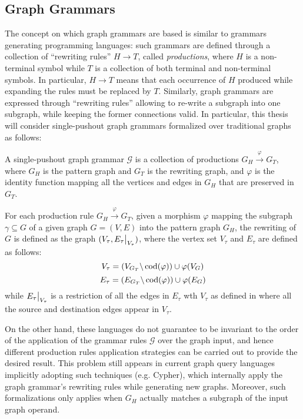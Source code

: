 \subsection{Graph Grammars}\label{subsec:ggram}
The concept on which  graph grammars are based is similar to grammars generating programming languages: such grammars are defined through a collection of ``rewriting rules'' $H\to T$, called \textit{productions}, where $H$ is a non-terminal symbol while $T$ is a collection of both terminal and non-terminal symbols. In particular, $H\to T$ means that each occurrence of $H$ produced while expanding the rules must be replaced by $T$. Similarly, graph grammars are expressed through ``rewriting rules'' allowing to re-write a subgraph into one subgraph, while keeping the former connections valid. In particular, this thesis will consider single-pushout graph grammars formalized over traditional graphs as follows:

\begin{definition}
	\label{def:graphgrammar}
  A single-pushout graph grammar $\mathcal{G}$ \cite{ModCheckWithGG,Lowe93} is a collection of productions $G_H\xrightarrow{\varphi}G_T$, where $G_H$ is the pattern graph and $G_T$ is the rewriting graph, and $\varphi$ is the identity function mapping all the vertices and edges in $G_H$ that are preserved in $G_T$.

  For each production rule $G_H\xrightarrow{\varphi}G_T$, given a morphism $\varphi$ mapping the subgraph $\gamma\subseteq G$ of a given graph $G=(V,E)$ into the pattern graph $G_H$, the rewriting of $G$ is defined as the graph $(V_\tau,\restr{E_\tau}{V_\tau})$, where the vertex set $V_\tau$ and $E_\tau$ are defined as follows:
  \[V_\tau = (V_{G_T}\backslash \operatorname{cod}(\varphi))\cup \varphi(V_G)\]
  \[E_\tau = (E_{G_T}\backslash \operatorname{cod}(\varphi))\cup \varphi(E_G)\]
  while $\restr{E_\tau}{V_\tau}$ is a restriction of all the edges in $E_\tau$ wth $V_\tau$ as defined in \cite{ModCheckWithGG} where all the source and destination edges appear in $V_\tau$.
\end{definition}

On the other hand, these languages do not guarantee to be invariant to the order of the application of the grammar rules $\mathcal{G}$ over the graph input, and hence different production rules application strategies can be carried out to provide the desired result. %
This problem still appears in current graph query languages implicitly adopting such techniques (e.g. Cypher), which internally apply the graph grammar's rewriting rules while generating new graphs. Moreover, such formalizations only applies when $G_H$ actually matches  a subgraph of the input graph operand.

